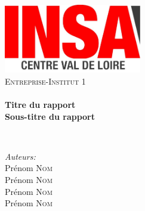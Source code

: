 \begin{titlepage}
    \begin{center}
        \includegraphics[width=0.45\textwidth]{figures/logos/Logo_INSA_CVL}\\[0.9cm]

        \textsc{\LARGE Entreprise-Institut 1}\\[0.35cm]

        \HRule \\[0.4cm]

            {\huge \bfseries Titre du rapport\\[0.15cm]
            \Large Sous-titre du rapport\\[0.4cm] }

        \HRule \\[1.5cm]

        \begin{minipage}{0.4\textwidth}
            \begin{flushleft} \large
                \emph{Auteurs:}\\
                    Prénom \textsc{Nom}\\
                    Prénom \textsc{Nom}\\
                    Prénom \textsc{Nom}\\
                    Prénom \textsc{Nom}


\end{flushleft}
\end{minipage}
\end{center}
\end{titlepage}
